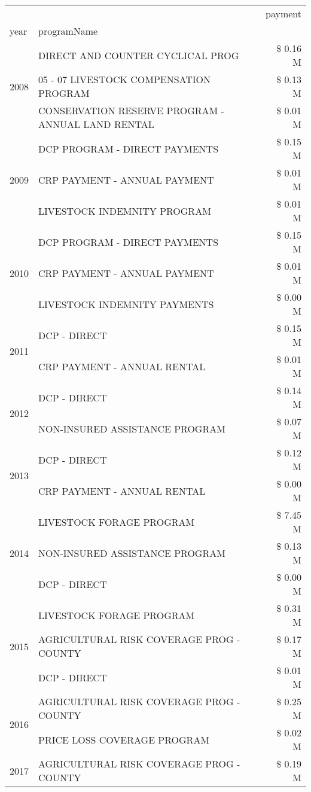 \begin{tabular}{llr}
\toprule
 &  & payment \\
year & programName &  \\
\midrule
\multirow[t]{3}{*}{2008} & DIRECT AND COUNTER CYCLICAL PROG & \$ 0.16 M \\
 & 05 - 07 LIVESTOCK COMPENSATION PROGRAM & \$ 0.13 M \\
 & CONSERVATION RESERVE PROGRAM - ANNUAL LAND RENTAL & \$ 0.01 M \\
\cline{1-3}
\multirow[t]{3}{*}{2009} & DCP PROGRAM - DIRECT PAYMENTS & \$ 0.15 M \\
 & CRP PAYMENT - ANNUAL PAYMENT & \$ 0.01 M \\
 & LIVESTOCK INDEMNITY PROGRAM & \$ 0.01 M \\
\cline{1-3}
\multirow[t]{3}{*}{2010} & DCP PROGRAM - DIRECT PAYMENTS & \$ 0.15 M \\
 & CRP PAYMENT - ANNUAL PAYMENT & \$ 0.01 M \\
 & LIVESTOCK INDEMNITY PAYMENTS & \$ 0.00 M \\
\cline{1-3}
\multirow[t]{2}{*}{2011} & DCP - DIRECT & \$ 0.15 M \\
 & CRP PAYMENT - ANNUAL RENTAL & \$ 0.01 M \\
\cline{1-3}
\multirow[t]{2}{*}{2012} & DCP - DIRECT & \$ 0.14 M \\
 & NON-INSURED ASSISTANCE PROGRAM & \$ 0.07 M \\
\cline{1-3}
\multirow[t]{2}{*}{2013} & DCP - DIRECT & \$ 0.12 M \\
 & CRP PAYMENT - ANNUAL RENTAL & \$ 0.00 M \\
\cline{1-3}
\multirow[t]{3}{*}{2014} & LIVESTOCK FORAGE PROGRAM & \$ 7.45 M \\
 & NON-INSURED ASSISTANCE PROGRAM & \$ 0.13 M \\
 & DCP - DIRECT & \$ 0.00 M \\
\cline{1-3}
\multirow[t]{3}{*}{2015} & LIVESTOCK FORAGE PROGRAM & \$ 0.31 M \\
 & AGRICULTURAL RISK COVERAGE PROG - COUNTY & \$ 0.17 M \\
 & DCP - DIRECT & \$ 0.01 M \\
\cline{1-3}
\multirow[t]{2}{*}{2016} & AGRICULTURAL RISK COVERAGE PROG - COUNTY & \$ 0.25 M \\
 & PRICE LOSS COVERAGE PROGRAM & \$ 0.02 M \\
\cline{1-3}
\multirow[t]{2}{*}{2017} & AGRICULTURAL RISK COVERAGE PROG - COUNTY & \$ 0.19 M \\

\end{tabular}
